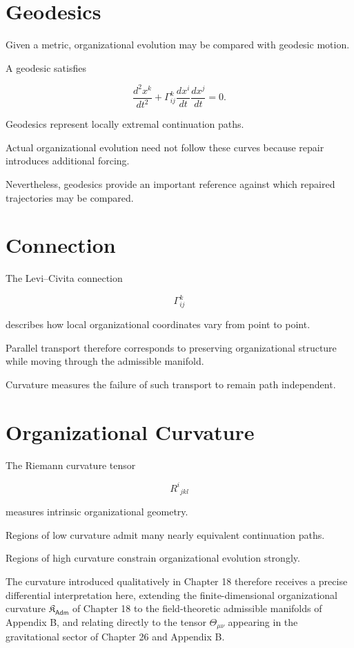 \documentclass[11pt,oneside]{book}
\numberwithin{equation}{chapter}
\theoremstyle{definition}
\theoremstyle{plain}
\newcommand{\Adm}{\mathsf{Adm}}
\begin{document}
\section{Geodesics}

Given a metric, organizational evolution may be compared with geodesic
motion.

A geodesic satisfies

\[
\frac{d^2x^k}{dt^2}
+
\Gamma^k_{ij}
\frac{dx^i}{dt}
\frac{dx^j}{dt}
=
0.
\]

Geodesics represent locally extremal continuation paths.

Actual organizational evolution need not follow these curves because
repair introduces additional forcing.

Nevertheless, geodesics provide an important reference against which
repaired trajectories may be compared.

\section{Connection}

The Levi--Civita connection

\[
\Gamma^k_{ij}
\]

describes how local organizational coordinates vary from point to point.

Parallel transport therefore corresponds to preserving organizational
structure while moving through the admissible manifold.

Curvature measures the failure of such transport to remain path
independent.

\section{Organizational Curvature}

The Riemann curvature tensor

\[
R^i{}_{jkl}
\]

measures intrinsic organizational geometry.

Regions of low curvature admit many nearly equivalent continuation paths.

Regions of high curvature constrain organizational evolution strongly.

The curvature introduced qualitatively in Chapter 18 therefore receives a
precise differential interpretation here, extending the finite-dimensional
organizational curvature \(\mathfrak K_\Adm\) of Chapter 18 to the
field-theoretic admissible manifolds of Appendix B, and relating directly
to the tensor \(\Theta_{\mu\nu}\) appearing in the gravitational sector of
Chapter 26 and Appendix B.
\end{document}
